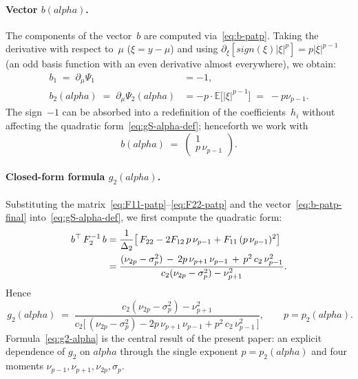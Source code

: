 \documentclass[11pt]{article}
\def\alpha{alpha}%
\def\vec#1{#1}%
\def\mathbf#1{#1}%
\def\mathrm#1{#1}%
\theoremstyle{definition}
\newcommand{\E}{\mathbb{E}}
\begin{document}
\paragraph{Vector $\vec b(\alpha)$.}
The components of the vector~$\vec b$ are computed via~\eqref{eq:b-patp}.
Taking the derivative with respect to~$\mu$ ($\xi = y - \mu$) and using
$\partial_{\xi}[\mathrm{sign}(\xi)|\xi|^p] = p|\xi|^{p-1}$
(an odd basis function with an even derivative almost everywhere),
we obtain:
\begin{align}
  b_1 \;=\; \partial_{\mu} \Psi_1
     &= -1,\\
  b_2(\alpha) \;=\; \partial_{\mu} \Psi_2(\alpha)
     &= -p \cdot \E\bigl[|\xi|^{p-1}\bigr]
     \;=\; -p \nu_{p-1}.
\end{align}
The sign~$-1$ can be absorbed into a redefinition of the coefficients~$h_i$
without affecting the quadratic form~\eqref{eq:gS-alpha-def}; henceforth
we work with
\begin{equation}\label{eq:b-patp-final}
  \vec b(\alpha)
  \;=\;
  \begin{pmatrix} 1 \\ p\,\nu_{p-1} \end{pmatrix}.
\end{equation}

\paragraph{Closed-form formula $g_2(\alpha)$.}
Substituting the matrix~\eqref{eq:F11-patp}--\eqref{eq:F22-patp} and the
vector~\eqref{eq:b-patp-final} into~\eqref{eq:gS-alpha-def}, we first
compute the quadratic form:
\begin{align}
  \vec b^{\top}\,\mathbf{F}_2^{-1}\,\vec b
   &= \frac{1}{\Delta_2}\bigl[\,F_{22} - 2 F_{12}\, p\,\nu_{p-1}
                              + F_{11}\,(p\,\nu_{p-1})^2\bigr]
   \notag\\
   &= \frac{(\nu_{2p} - \sigma_p^2) \,-\, 2 p\,\nu_{p+1}\,\nu_{p-1}
              \,+\, p^2\,c_2\,\nu_{p-1}^2}
           {c_2(\nu_{2p} - \sigma_p^2) - \nu_{p+1}^2}.
  \label{eq:bFb-patp}
\end{align}
Hence
\begin{equation}\label{eq:g2-alpha}
  \boxed{\,
  g_2(\alpha)
  \;=\;
  \frac{c_2(\nu_{2p} - \sigma_p^2) - \nu_{p+1}^2}
       {c_2\bigl[\,(\nu_{2p} - \sigma_p^2)
                  - 2 p\,\nu_{p+1}\,\nu_{p-1}
                  + p^2\,c_2\,\nu_{p-1}^2\,\bigr]},
  \qquad p = p_2(\alpha).
  \,}
\end{equation}
Formula~\eqref{eq:g2-alpha} is the central result of the present paper:
an explicit dependence of $g_2$ on $\alpha$ through the single exponent
$p = p_2(\alpha)$ and four moments $\nu_{p-1}, \nu_{p+1}, \nu_{2p},
\sigma_p$.
\end{document}
